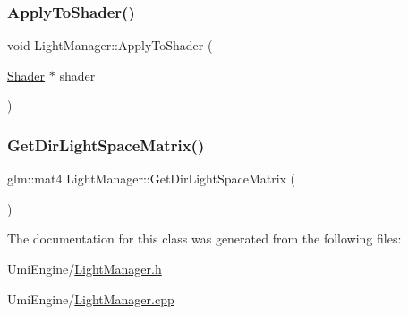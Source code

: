 \mbox{\label{class_light_manager_a107e825c6ce685f9946ffbf83b6018de}} 
\subsubsection{\texorpdfstring{ApplyToShader()}{ApplyToShader()}}
{\footnotesize\ttfamily void Light\+Manager\+::\+Apply\+To\+Shader (\begin{DoxyParamCaption}\item[{\mbox{\hyperlink{class_shader}{Shader}} $\ast$}]{shader }\end{DoxyParamCaption})\hspace{0.3cm}{\ttfamily [static]}}

\mbox{\label{class_light_manager_a9d24844d79e4e6a62017584ce9f1a154}} 
\subsubsection{\texorpdfstring{GetDirLightSpaceMatrix()}{GetDirLightSpaceMatrix()}}
{\footnotesize\ttfamily glm\+::mat4 Light\+Manager\+::\+Get\+Dir\+Light\+Space\+Matrix (\begin{DoxyParamCaption}{ }\end{DoxyParamCaption})\hspace{0.3cm}{\ttfamily [static]}}



The documentation for this class was generated from the following files\+:\begin{DoxyCompactItemize}
\item 
Umi\+Engine/\mbox{\hyperlink{_light_manager_8h}{Light\+Manager.\+h}}\item 
Umi\+Engine/\mbox{\hyperlink{_light_manager_8cpp}{Light\+Manager.\+cpp}}\end{DoxyCompactItemize}
